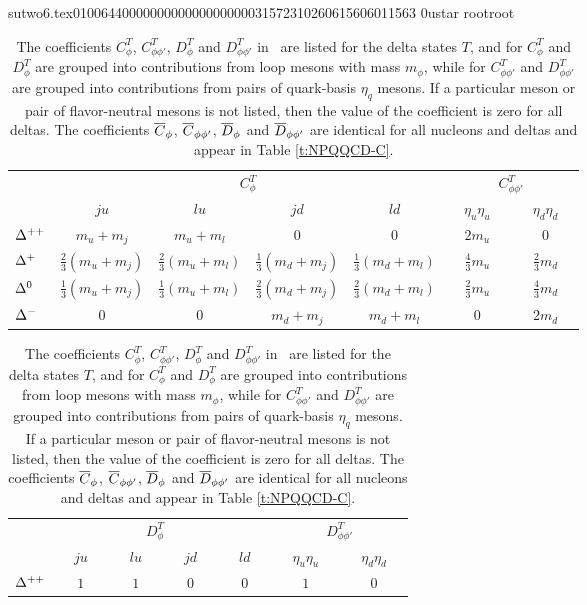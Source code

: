                                                                                                                                                                                                                                                                                       sutwo6.tex                                                                                          0100644 0000000 0000000 00000315723 10260615606 011563  0                                                                                                    ustar   root                            root                                                                                                                                                                                                                   \documentclass[prd,amssymb,amsmath,showpacs,nofootinbib,superscriptaddress]{revtex4}
\begin{document}
\begin{table}[ht]
\caption{The coefficients $C^T_\phi$, $C^T_{\phi\phi'}$, $D^T_\phi$
  and $D^T_{\phi\phi'}$ in \PQCPT\ are listed for the delta states
  $T$, and for $C^T_\phi$ and $D^T_\phi$ are grouped into
  contributions from loop mesons with mass $m_\phi$, while for
  $C^T_{\phi\phi'}$ and $D^T_{\phi\phi'}$ are grouped into
  contributions from pairs of quark-basis $\eta_q$ mesons. If a
  particular meson or pair of flavor-neutral mesons is not listed,
  then the value of the coefficient is zero for all deltas. The
  coefficients ${\overline{C}}_\phi$, ${\overline{C}}_{\phi \phi'}$, ${\overline{D}}_\phi$ and
  ${\overline{D}}_{\phi \phi'}$  are identical for all nucleons and deltas and
  appear in Table \ref{t:NPQQCD-C}.}

\begin{tabular}{l | c c c c | c c}
& \multicolumn{4}{c|}{$C^T_\phi $} & \multicolumn{2}{c}{$C^T_{\phi\phi'}$} \\
      & $\quad ju \quad$ & $\quad lu \quad $ & $\quad jd \quad $  & $\quad ld \quad$ & $\quad \eta_u \eta_u \quad$ & $\quad \eta_d \eta_d \quad$ \\
\hline
${\Delta}^{++}$       
           &  $m_u + m_j$ & $m_u + m_l$  & $0$ & $0$ 
           &  $2 m_u$ & $0$ \\

${\Delta}^+$ 
           &  $\frac{2}{3}( m_u + m_j)$ & $\frac{2}{3}(m_u + m_l)$  & $\frac{1}{3}(m_d +  m_j)$ & $\frac{1}{3}(m_d + m_l)$
           &  $\frac{4}{3} m_u$ & $\frac{2}{3} m_d$ \\

${\Delta}^0$    
           &  $\frac{1}{3}(m_u + m_j)$ & $\frac{1}{3} (m_u + m_l)$  & $\frac{2}{3}( m_d + m_j)$ & $\frac{2}{3} (m_d + m_l)$ 
           &  $\frac{2}{3} m_u$ & $\frac{4}{3} m_d$ \\

${\Delta}^-$ 
           &  $0$ & $0$  & $m_d + m_j$ & $m_d + m_l$ 
           &  $0$ & $2 m_d$ 
\end{tabular}

\bigskip

\begin{tabular}{l | c c c c | c c}
  & \multicolumn{4}{c|}{$D^T_\phi \phantom{ap}$} 
  & \multicolumn{2}{c}{$D^T_{\phi\phi'}$ \phantom{sp}} \\
  & $\quad ju \quad$ 
  & $\quad lu \quad $ 
  & $\quad jd \quad $  
  & $\quad ld \quad$ 
  & $\quad \eta_u \eta_u \quad$ 
  & $\quad \eta_d \eta_d \quad$ \\
\hline
${\Delta}^{++}$       
  & $1$ 
  & $1$  
  & $0$ 
  & $0$ 
  & $1$ 
  & $0$ \\


\end{tabular}
\end{table}
\end{document}
